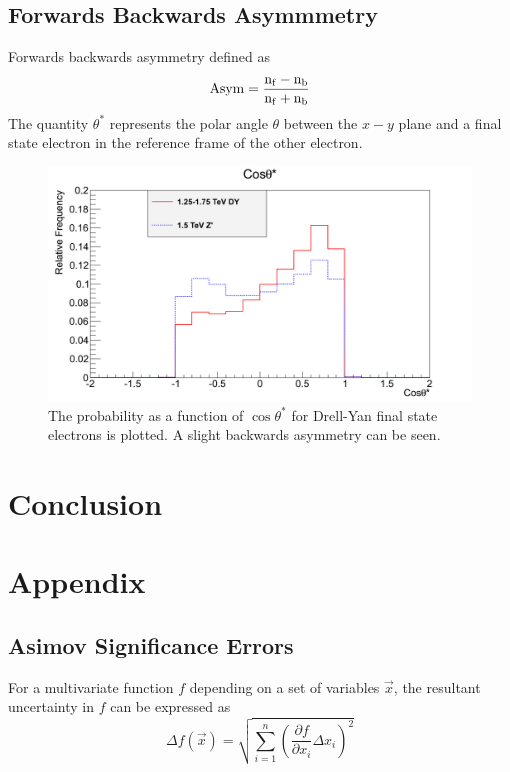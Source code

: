 \documentclass{article}
\begin{document}
\subsection{Forwards Backwards Asymmmetry}

Forwards backwards asymmetry defined as 
\begin{equation}
\rm{Asym} = \frac{n_f - n_b}{n_f + n_b}
\end{equation}
The quantity $\theta^*$ represents the polar angle $\theta$ between the $x-y$ plane and a final state electron in the reference frame of the other electron.
\begin{figure}[h]
    \centering \includegraphics[scale=0.3]{images/cosThetaStar.png} \caption{The probability as a function of $\cos\theta^*$ for Drell-Yan final state electrons is plotted. A slight backwards asymmetry can be seen. \label{fig:cosTheta} }
\end{figure}

\section{Conclusion}
\label{sec:Conclusion}

\section{Appendix}
\subsection{Asimov Significance Errors}
\label{sec:appendix_errors}
For a multivariate function $f$ depending on a set of variables $\overrightarrow{x}$, the resultant uncertainty in $f$ can be expressed as 
\begin{equation}
\Delta f(\overrightarrow{x}) = \sqrt{\sum_{i=1}^{n} 
\left( \frac{\partial f}{\partial x_i}\Delta x_i \right)^2}
\end{equation}
\end{document}
